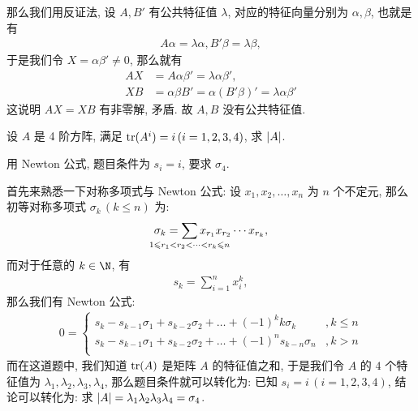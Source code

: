 \begin{exercise}[series=exer]
\begin{answer}
      那么我们用反证法, 设 $ A, B' $ 有公共特征值 $ \lambda $, 对应的特征向量分别为 $ \alpha, \beta $, 也就是有
      \begin{align*}
          A\alpha = \lambda\alpha, B'\beta = \lambda\beta,
      \end{align*}
      于是我们令 $ X = \alpha\beta' \ne 0 $, 那么就有
      \begin{align*}
          AX & = A\alpha\beta' = \lambda\alpha\beta',\\
          XB & = \alpha\beta B' = \alpha(B'\beta)' = \lambda\alpha\beta'
      \end{align*}
      这说明 $ AX = XB $ 有非零解, 矛盾. 故 $ A, B $ 没有公共特征值.
  \end{answer}
  \item 设 $ A $ 是 4 阶方阵, 满足 $ \tr(A^{i}) = i\,(i = 1, 2, 3, 4) $, 求 $ \abs{A} $.
  \begin{hint}
      用 Newton 公式, 题目条件为 $ s_{i} = i $, 要求 $ \sigma_{4} $.
  \end{hint}
  \begin{answer}
      首先来熟悉一下对称多项式与 Newton 公式: 设 $ x_{1}, x_{2}, \dots, x_{n} $ 为 $ n $ 个不定元, 那么初等对称多项式 $ \sigma_{k}\,(k \le n) $ 为:
      \begin{align*}
          \sigma_{k} = \sum_{\mathclap{1 \le r_{1} < r_{2} < \dots < r_{k} \le n}} x_{r_{1}}x_{r_{2}}\dotsm x_{r_{k}},
      \end{align*}
      而对于任意的 $ k \in \N $, 有
      \begin{align*}
          s_{k} = \sum_{i = 1}^{n}x_{i}^{k},
      \end{align*}
      那么我们有 Newton 公式:
      \begin{align*}
          0 = \begin{cases}
              s_{k} - s_{k - 1}\sigma_{1} + s_{k - 2}\sigma_{2} + \dots + (-1)^{k}k\sigma_{k} & , k \le n \\
              s_{k} - s_{k - 1}\sigma_{1} + s_{k - 2}\sigma_{2} + \dots + (-1)^{n}s_{k - n}\sigma_{n} & , k > n\\
          \end{cases}
      \end{align*}
      而在这道题中, 我们知道 $ \tr(A) $ 是矩阵 $ A $ 的特征值之和, 于是我们令 $ A $ 的 $ 4 $ 个特征值为 $ \lambda_{1}, \lambda_{2}, \lambda_{3}, \lambda_{4} $, 那么题目条件就可以转化为: 已知 $ s_{i} = i\,(i = 1, 2, 3, 4) $, 结论可以转化为: 求 $ \abs{A} = \lambda_{1}\lambda_{2}\lambda_{3}\lambda_{4} = \sigma_{4} $.


\end{answer}
\end{exercise}
